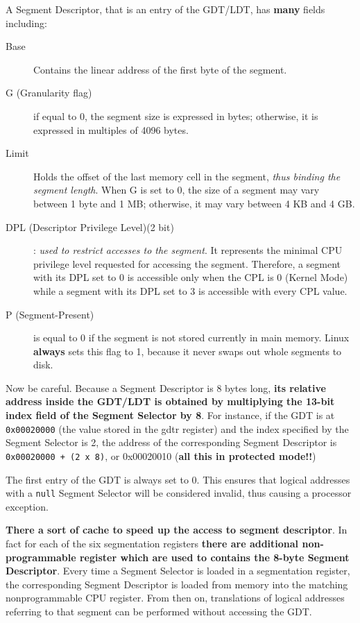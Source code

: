 \documentclass[10pt,a4paper]{article}
\begin{document}
A Segment Descriptor, that is an entry of the GDT/LDT, has \textbf{many} fields including:
\begin{description}
\item[Base] Contains the linear address of the first byte of the segment.
\item[G (Granularity flag)] if equal to 0, the segment size is expressed in bytes; otherwise, it is expressed in multiples of 4096 bytes.
\item[Limit] Holds the offset of the last memory cell in the segment, \textit{thus binding the segment length}. When G is set to 0, the size of a segment may vary between 1 byte and 1 MB; otherwise, it may vary between 4 KB and 4 GB.
\item[DPL (Descriptor Privilege Level)(2 bit)]: \textit{used to restrict accesses to the segment}. It represents the minimal CPU privilege level requested for accessing the segment. Therefore, a segment with its DPL set to 0 is accessible only when the CPL is 0 (Kernel Mode) while a segment with its DPL set to 3 is accessible with every CPL value.
\item[P (Segment-Present)] is equal to 0 if the segment is not stored currently in main memory. Linux \textbf{always} sets this flag to 1, because it never swaps out whole segments to disk.
\end{description}

Now be careful. Because a Segment Descriptor is 8 bytes long, \textbf{its relative address inside the GDT/LDT is obtained by multiplying the 13-bit index field of the Segment Selector by 8}. For instance, if the GDT is at \texttt{0x00020000} (the value stored in the gdtr register) and the index specified by the Segment Selector is 2, the address of the corresponding Segment Descriptor is \texttt{0x00020000 + (2 x 8)}, or 0x00020010 (\textbf{all this in protected mode!!})

The first entry of the GDT is always set to 0. This ensures that logical addresses with a \texttt{null} Segment Selector will be considered invalid, thus causing a processor exception. 

\textbf{There a sort of cache to speed up the access to segment descriptor}. In fact for each of the six segmentation registers \textbf{there are additional non-programmable register which are used to contains the 8-byte Segment Descriptor}.  Every time a Segment Selector is loaded in a segmentation register, the corresponding Segment Descriptor is loaded from memory into the matching nonprogrammable CPU register. From then on, translations of logical addresses referring to that segment can be performed without accessing the GDT.
\end{document}
